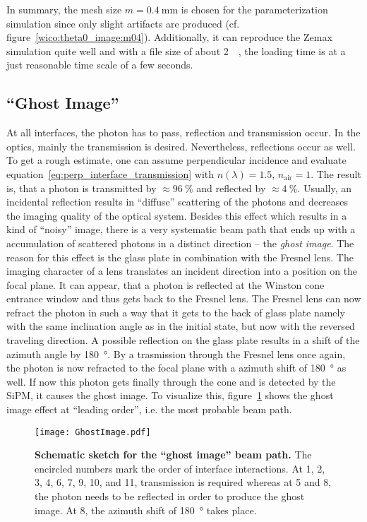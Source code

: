 In summary, the mesh size $m=\SI{0.4}{\milli\meter}$ is chosen for the parameterization simulation since only slight artifacts are produced (cf. figure~\ref{wico:theta0_image:m04}). Additionally, it can reproduce the Zemax simulation quite well and with a file size of about \SI{2}{\mebi\byte}, the loading time is at a just reasonable time scale of a few seconds.

\subsection{\enquote{Ghost Image}}\label{sec:ghost_image}

At all interfaces, the photon has to pass, reflection and transmission occur. In the \iceact optics, mainly the transmission is desired. Nevertheless, reflections occur as well. To get a rough estimate, one can assume perpendicular incidence and evaluate equation~\eqref{eq:perp_interface_transmission} with $n(\lambda)=\num{1.5}$, $n_\text{air}=1$. The result is, that a photon is transmitted by $\approx\SI{96}{\percent}$ and reflected by $\approx\SI{4}{\percent}$. Usually, an incidental reflection results in \enquote{diffuse} scattering of the photons and decreases the imaging quality of the optical system. Besides this effect which results in a kind of \enquote{noisy} image, there is a very systematic beam path that ends up with a accumulation of scattered photons in a distinct direction -- the \textit{ghost image}. The reason for this effect is the glass plate in combination with the Fresnel lens. The imaging character of a lens translates an incident direction into a position on the focal plane. It can appear, that a photon is reflected at the Winston cone entrance window and thus gets back to the Fresnel lens. The Fresnel lens can now refract the photon in such a way that it gets to the back of glass plate namely with the same inclination angle as in the initial state, but now with the reversed traveling direction. A possible reflection on the glass plate results in a shift of the azimuth angle by \SI{180}{\degree}. By a trasmission through the Fresnel lens once again, the photon is now refracted to the focal plane with a azimuth shift of \SI{180}{\degree} as well. If now this photon gets finally through the cone and is detected by the SiPM, it causes the ghost image. To visualize this, figure~\ref{ghostimage_path} shows the ghost image effect at \enquote{leading order}, i.e. the most probable beam path.

\begin{figure}[H]
	\centering
	\texttt{[image: GhostImage.pdf]}
	\caption[Schematic sketch for the \enquote{ghost image} beam path]{\textbf{Schematic sketch for the \enquote{ghost image} beam path.} The encircled numbers mark the order of interface interactions. At 1, 2, 3, 4, 6, 7, 9, 10, and 11, transmission is required whereas at 5 and 8, the photon needs to be reflected in order to produce the ghost image. At 8, the azimuth shift of \SI{180}{\degree} takes place.}
	\label{ghostimage_path}
\end{figure}

